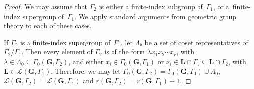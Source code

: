 \documentclass[11pt]{article}
\numberwithin{equation}{section}
\newcommand{\Ga}{\mathbf{G}}
\newcommand{\La}{\mathbf{L}}
\newcommand{\subgroups}{\mathcal{L}}
\numberwithin{equation}{section}
\theoremstyle{definition}
\begin{document}
\begin{proof}
We may assume that $\Gamma_2$ is either a finite-index subgroup of~$\Gamma_1$, or a~finite-index supergroup of~$\Gamma_1$. We apply standard arguments from geometric group theory to each of these cases.

If $\Gamma_2$ is a finite-index supergroup of~$\Gamma_1$, let $\Lambda_0$ be a set of coset representatives of $\Gamma_2 / \Gamma_1$. Then every element of $\Gamma_2$ is of the form $\lambda x_1 x_2 \cdots x_r$, with $\lambda \in \Lambda_0 \subseteq \Gamma_0(\Ga,\Gamma_2)$, and either $x_i \in \Gamma_0(\Ga,\Gamma_1)$ or $x_i \in \La \cap \Gamma_1 \subseteq \La \cap \Gamma_2$, with $\La \in \subgroups(\Ga,\Gamma_1)$. Therefore, we may let $\Gamma_0(\Ga,\Gamma_2) = \Gamma_0(\Ga,\Gamma_1) \cup \Lambda_0$,
$\subgroups(\Ga,\Gamma_2) = \subgroups(\Ga,\Gamma_1)$ and $r(\Ga,\Gamma_2) = r(\Ga,\Gamma_1) + 1$.


\end{proof}
\end{document}
